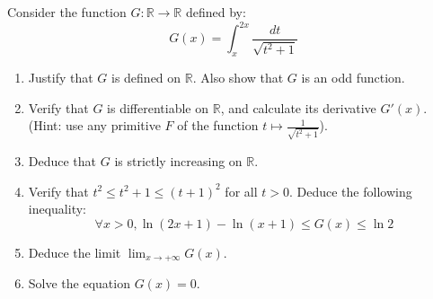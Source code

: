 \documentclass[12pt]{article}
\begin{document}
\section{}
Consider the function $G: \mathbb{R} \to \mathbb{R}$ defined by:
$$G(x) = \int_x^{2x} \frac{dt}{\sqrt{t^2 + 1}}$$

\begin{enumerate}
    \item Justify that $G$ is defined on $\mathbb{R}$. Also show that $G$ is an odd function.
    \item Verify that $G$ is differentiable on $\mathbb{R}$, and calculate its derivative $G'(x)$. (Hint: use any primitive $F$ of the function $t \mapsto \frac{1}{\sqrt{t^2 + 1}}$).
    \item Deduce that $G$ is strictly increasing on $\mathbb{R}$.
    \item Verify that $t^2 \leq t^2 + 1 \leq (t + 1)^2$ for all $t > 0$. Deduce the following inequality:
    $$\forall x > 0, \ln(2x + 1) - \ln(x + 1) \leq G(x) \leq \ln 2$$
    \item Deduce the limit $\lim_{x\to +\infty} G(x)$.
    \item Solve the equation $G(x) = 0$.
\end{enumerate}

\newpage
\end{document}
